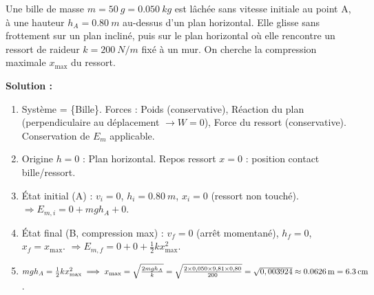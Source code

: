 \documentclass[11pt]{article}
\newcommand{\cle}[1]{{\popxbold\color{popdark}#1}}
\begin{document}
\begin{exemplebox}
Une bille de masse $m = \SI{50}{g} = \SI{0,050}{kg}$ est lâchée sans vitesse initiale au point A, à une hauteur $h_A = \SI{0,80}{m}$ au-dessus d'un plan horizontal. Elle glisse sans frottement sur un plan incliné, puis sur le plan horizontal où elle rencontre un ressort de raideur $k = \SI{200}{N/m}$ fixé à un mur. On cherche la compression maximale $x_{\text{max}}$ du ressort.
\begin{center}
\end{center}
\textbf{Solution :}
\begin{enumerate}
    \item Système = \{Bille\}. Forces : Poids (conservative), Réaction du plan (perpendiculaire au déplacement $\to W=0$), Force du ressort (conservative). \cle{Conservation de $E_m$ applicable}.
    \item Origine $h=0$ : Plan horizontal. Repos ressort $x=0$ : position contact bille/ressort.
    \item État initial (A) : $v_i=0$, $h_i=\SI{0,80}{m}$, $x_i=0$ (ressort non touché). $\Rightarrow E_{m,i} = 0 + mgh_A + 0$.
    \item État final (B, compression max) : $v_f=0$ (arrêt momentané), $h_f=0$, $x_f=x_{\text{max}}$. $\Rightarrow E_{m,f} = 0 + 0 + \frac{1}{2}k x_{\text{max}}^2$.
    \item $mgh_A = \frac{1}{2}k x_{\text{max}}^2 \implies x_{\text{max}} = \sqrt{\frac{2mgh_A}{k}} = \sqrt{\frac{2 \times 0,050 \times 9,81 \times 0,80}{200}} = \sqrt{0,003924} \approx \SI{0,0626}{m} = \textbf{\SI{6,3}{cm}}$.
\end{enumerate}
\end{exemplebox}
\end{document}
